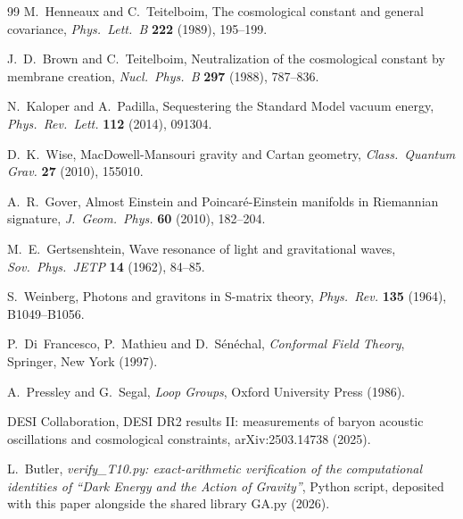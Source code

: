 \documentclass[11pt]{article}
\theoremstyle{definition}
\begin{document}
\begin{thebibliography}{99}
M.~Henneaux and C.~Teitelboim,
The cosmological constant and general covariance,
\emph{Phys.\ Lett.\ B} \textbf{222} (1989), 195--199.

J.~D.~Brown and C.~Teitelboim,
Neutralization of the cosmological constant by membrane creation,
\emph{Nucl.\ Phys.\ B} \textbf{297} (1988), 787--836.

N.~Kaloper and A.~Padilla,
Sequestering the Standard Model vacuum energy,
\emph{Phys.\ Rev.\ Lett.} \textbf{112} (2014), 091304.

D.~K.~Wise,
MacDowell-Mansouri gravity and Cartan geometry,
\emph{Class.\ Quantum Grav.} \textbf{27} (2010), 155010.

A.~R.~Gover,
Almost Einstein and Poincar\'e-Einstein manifolds in Riemannian signature,
\emph{J.\ Geom.\ Phys.} \textbf{60} (2010), 182--204.

M.~E.~Gertsenshtein,
Wave resonance of light and gravitational waves,
\emph{Sov.\ Phys.\ JETP} \textbf{14} (1962), 84--85.

S.~Weinberg,
Photons and gravitons in S-matrix theory,
\emph{Phys.\ Rev.} \textbf{135} (1964), B1049--B1056.

P.~Di~Francesco, P.~Mathieu and D.~S\'en\'echal,
\emph{Conformal Field Theory},
Springer, New York (1997).

A.~Pressley and G.~Segal,
\emph{Loop Groups},
Oxford University Press (1986).

DESI Collaboration,
DESI DR2 results II: measurements of baryon acoustic oscillations and cosmological constraints,
arXiv:2503.14738 (2025).

L.~Butler,
\emph{verify\_T10.py: exact-arithmetic verification of the computational identities of ``Dark Energy and the Action of Gravity''},
Python script, deposited with this paper alongside the shared library GA.py (2026).

\end{thebibliography}
\end{document}
